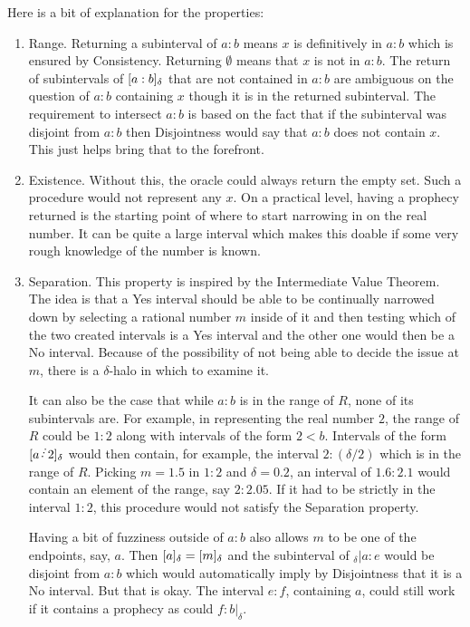 \documentclass[12pt]{article}
\begin{document}
Here is a bit of explanation for the properties:
\begin{enumerate}
    \item Range. Returning a subinterval of $a:b$ means $x$ is definitively in $a:b$ which is ensured by Consistency. Returning $\emptyset$ means that $x$ is not in $a:b$. The return of subintervals of $[a:b]_{\delta}$ that are not contained in $a:b$ are ambiguous on the question of $a:b$ containing $x$ though it is in the returned subinterval. The requirement to intersect $a:b$ is based on the fact that if the subinterval was disjoint from $a:b$ then Disjointness would say that $a:b$ does not contain $x$. This just helps bring that to the forefront. 
    
    \item Existence. Without this, the oracle could always return the empty set. Such a procedure would not represent any $x$. On a practical level, having a prophecy returned is the starting point of where to start narrowing in on the real number. It can be quite a large interval which makes this doable if some very rough knowledge of the number is known. 
    
    \item Separation. This property is inspired by the Intermediate Value Theorem. The idea is that a Yes interval should be able to be continually narrowed down by selecting a rational number $m$ inside of it and then testing which of the two created intervals is a Yes interval and the other one would then be a No interval. Because of the possibility of not being able to decide the issue at $m$, there is a $\delta$-halo in which to examine it. 
    
    It can also be the case that while $a:b$ is in the range of $R$, none of its subintervals are. For example, in representing the real number $2$, the range of $R$ could be $1:2$ along with intervals of the form $2 \lt b$. Intervals of the form $\halo{a\lte 2}$ would then contain, for example, the interval $2:(\delta/2)$ which is in the range of $R$. Picking $m=1.5$ in $1:2$ and $\delta = 0.2$, an interval of $1.6:2.1$ would contain an element of the range, say $2:2.05$. If it had to be strictly in the interval $1:2$, this procedure would not satisfy the Separation property. 

    Having a bit of fuzziness outside of $a:b$ also allows $m$ to be one of the endpoints, say, $a$. Then $[a]_{\delta} = [m]_{\delta}$ and the subinterval of ${}_\delta | a : e$ would be disjoint from $a:b$ which would automatically imply by Disjointness that it is a No interval. But that is okay. The interval $e:f$, containing $a$, could still work if it contains a prophecy as could $f:b|_\delta$.
 

\end{enumerate}
\end{document}

